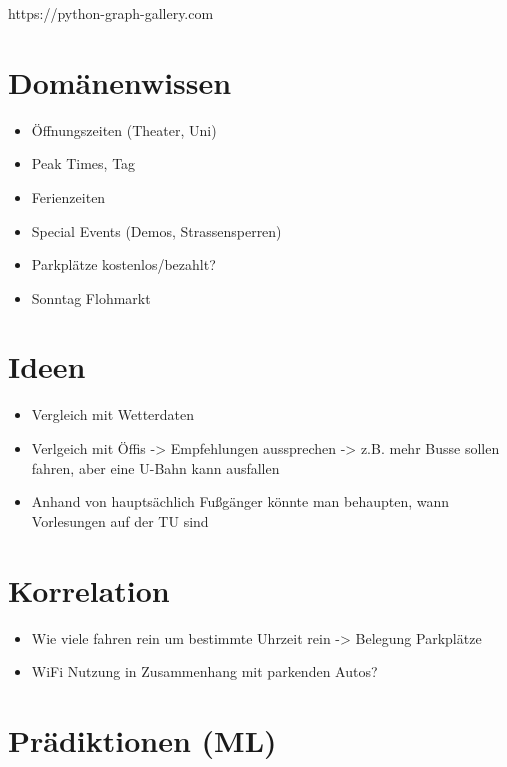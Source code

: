 \documentclass[11pt]{article}
\providecommand{\tightlist}{%
      \setlength{\itemsep}{0pt}\setlength{\parskip}{0pt}}
\begin{document}
https://python-graph-gallery.com

    \section{Domänenwissen}\label{domuxe4nenwissen}

\begin{itemize}
\tightlist
\item
  Öffnungszeiten (Theater, Uni)
\item
  Peak Times, Tag
\item
  Ferienzeiten
\item
  Special Events (Demos, Strassensperren)
\item
  Parkplätze kostenlos/bezahlt?
\item
  Sonntag Flohmarkt
\end{itemize}

\section{Ideen}\label{ideen}

\begin{itemize}
\tightlist
\item
  Vergleich mit Wetterdaten
\item
  Verlgeich mit Öffis -\textgreater{} Empfehlungen aussprechen
  -\textgreater{} z.B. mehr Busse sollen fahren, aber eine U-Bahn kann
  ausfallen
\item
  Anhand von hauptsächlich Fußgänger könnte man behaupten, wann
  Vorlesungen auf der TU sind
\end{itemize}

\section{Korrelation}\label{korrelation}

\begin{itemize}
\tightlist
\item
  Wie viele fahren rein um bestimmte Uhrzeit rein -\textgreater{}
  Belegung Parkplätze
\item
  WiFi Nutzung in Zusammenhang mit parkenden Autos?
\end{itemize}

\section{Prädiktionen (ML)}\label{pruxe4diktionen-ml}
\end{document}
